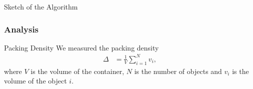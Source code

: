 \documentclass[sumlimits, intlimits]{beamer}
\begin{document}
\begin{frame}
\begin{block}{Sketch of the Algorithm}
%
\end{block}
\end{frame}

\begin{frame}
\frametitle{Analysis}
\begin{block}{Packing Density}
We measured the packing density
\begin{align*}
\Delta & = \frac 1 V \sum_{i = 1}^N v_i,
\end{align*}
where $V$ is the volume of the container,
$N$ is the number of objects and
$v_i$ is the volume of the object $i$.
\end{block}
\end{frame}
\end{document}
